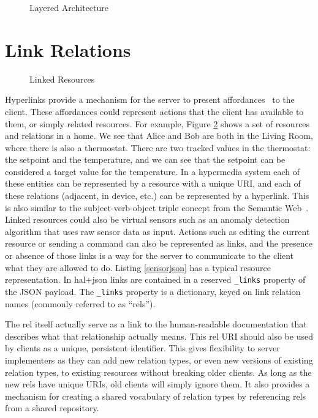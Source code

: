 \documentclass{acm_proc_article-sp}
\begin{document}
\begin{figure}
    \centering
    
    \caption{Layered Architecture}
    \label{chain_distributed}
\end{figure}

\section{Link Relations}

\begin{figure}
    \centering
    
    \caption{Linked Resources}
    \label{hyperlinks}
\end{figure}

Hyperlinks provide a mechanism for the server to present
affordances~\cite{gibson} to the client. These affordances could represent
actions that the client has available to them, or simply related resources. For
example, Figure \ref{hyperlinks} shows a set of resources and relations in a
home. We see that Alice and Bob are both in the Living Room, where there is
also a thermostat. There are two tracked values in the thermostat: the setpoint
and the temperature, and we can see that the setpoint can be considered a
target value for the temperature. In a hypermedia system each of these entities
can be represented by a resource with a unique URI, and each of these
relations (adjacent, in device, etc.) can be represented by a hyperlink. This
is also similar to the subject-verb-object triple concept from the Semantic
Web~\cite{bernerslee2001semantic}. Linked resources could also be virtual
sensors such as an anomaly detection algorithm that uses raw sensor data as
input. Actions such as editing the current resource or sending a command can
also be represented as links, and the presence or absence of those links is a
way for the server to communicate to the client what they are allowed to do.
Listing \ref{sensorjson} has a typical resource representation.  In hal+json
links are contained in a reserved \texttt{\_links} property of the JSON
payload. The \texttt{\_links} property is a dictionary, keyed on link relation
names (commonly referred to as ``rels'').

The rel itself actually serve as a link to the human-readable documentation
that describes what that relationship actually means. This rel URI should also
be used by clients as a unique, persistent identifier. This gives flexibility
to server implementers as they can add new relation types, or even new versions
of existing relation types, to existing resources without breaking older
clients. As long as the new rels have unique URIs, old clients will simply
ignore them. It also provides a mechanism for creating a shared vocabulary of
relation types by referencing rels from a shared repository.
\end{document}
